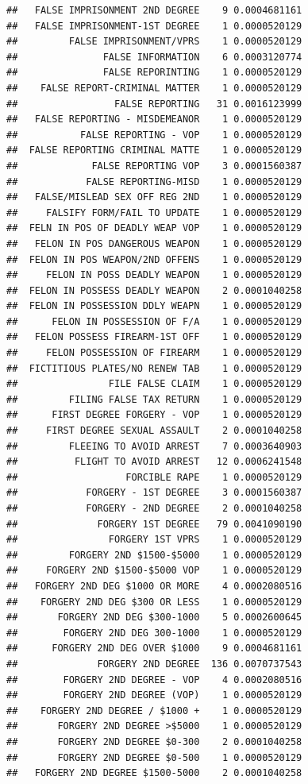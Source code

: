 \documentclass[]{book}
\begin{document}
\begin{verbatim}
##   FALSE IMPRISONMENT 2ND DEGREE    9 0.0004681161
##   FALSE IMPRISONMENT-1ST DEGREE    1 0.0000520129
##         FALSE IMPRISONMENT/VPRS    1 0.0000520129
##               FALSE INFORMATION    6 0.0003120774
##               FALSE REPORINTING    1 0.0000520129
##    FALSE REPORT-CRIMINAL MATTER    1 0.0000520129
##                 FALSE REPORTING   31 0.0016123999
##   FALSE REPORTING - MISDEMEANOR    1 0.0000520129
##           FALSE REPORTING - VOP    1 0.0000520129
##  FALSE REPORTING CRIMINAL MATTE    1 0.0000520129
##             FALSE REPORTING VOP    3 0.0001560387
##            FALSE REPORTING-MISD    1 0.0000520129
##   FALSE/MISLEAD SEX OFF REG 2ND    1 0.0000520129
##     FALSIFY FORM/FAIL TO UPDATE    1 0.0000520129
##  FELN IN POS OF DEADLY WEAP VOP    1 0.0000520129
##   FELON IN POS DANGEROUS WEAPON    1 0.0000520129
##  FELON IN POS WEAPON/2ND OFFENS    1 0.0000520129
##     FELON IN POSS DEADLY WEAPON    1 0.0000520129
##  FELON IN POSSESS DEADLY WEAPON    2 0.0001040258
##  FELON IN POSSESSION DDLY WEAPN    1 0.0000520129
##      FELON IN POSSESSION OF F/A    1 0.0000520129
##   FELON POSSESS FIREARM-1ST OFF    1 0.0000520129
##     FELON POSSESSION OF FIREARM    1 0.0000520129
##  FICTITIOUS PLATES/NO RENEW TAB    1 0.0000520129
##                FILE FALSE CLAIM    1 0.0000520129
##         FILING FALSE TAX RETURN    1 0.0000520129
##      FIRST DEGREE FORGERY - VOP    1 0.0000520129
##     FIRST DEGREE SEXUAL ASSAULT    2 0.0001040258
##         FLEEING TO AVOID ARREST    7 0.0003640903
##          FLIGHT TO AVOID ARREST   12 0.0006241548
##                   FORCIBLE RAPE    1 0.0000520129
##            FORGERY - 1ST DEGREE    3 0.0001560387
##            FORGERY - 2ND DEGREE    2 0.0001040258
##              FORGERY 1ST DEGREE   79 0.0041090190
##                FORGERY 1ST VPRS    1 0.0000520129
##         FORGERY 2ND $1500-$5000    1 0.0000520129
##     FORGERY 2ND $1500-$5000 VOP    1 0.0000520129
##   FORGERY 2ND DEG $1000 OR MORE    4 0.0002080516
##    FORGERY 2ND DEG $300 OR LESS    1 0.0000520129
##       FORGERY 2ND DEG $300-1000    5 0.0002600645
##        FORGERY 2ND DEG 300-1000    1 0.0000520129
##      FORGERY 2ND DEG OVER $1000    9 0.0004681161
##              FORGERY 2ND DEGREE  136 0.0070737543
##        FORGERY 2ND DEGREE - VOP    4 0.0002080516
##        FORGERY 2ND DEGREE (VOP)    1 0.0000520129
##    FORGERY 2ND DEGREE / $1000 +    1 0.0000520129
##       FORGERY 2ND DEGREE >$5000    1 0.0000520129
##       FORGERY 2ND DEGREE $0-300    2 0.0001040258
##       FORGERY 2ND DEGREE $0-500    1 0.0000520129
##   FORGERY 2ND DEGREE $1500-5000    2 0.0001040258

\end{verbatim}
\end{document}
